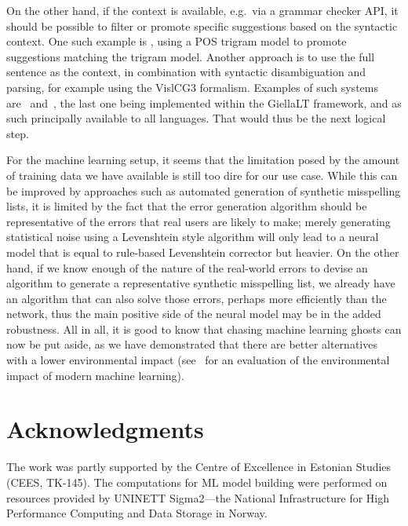 \documentclass{flammie}
\begin{document}
On the other hand, if the context is available, e.g.\ via a grammar checker API,
it should be possible to filter or promote specific suggestions based on the
syntactic context. One such example is \cite{pirinen2012improving}, using a POS
trigram model to promote suggestions matching the trigram model. Another
approach is to use the full sentence as the context, in combination with
syntactic disambiguation and parsing, for example using the VislCG3 formalism.
Examples of such systems are~\cite{Bick2006constraint}
and~\cite{wiechetek2019seeing}, the last one being implemented within the
GiellaLT framework, and as such principally available to all languages. That
would thus be the next logical step.

For the machine learning setup, it seems that the limitation posed by the amount
of training data we have available is still too dire for our use case. While
this can be improved by approaches such as automated generation of synthetic
misspelling lists, it is limited by the fact that the error generation algorithm
should be representative of the errors that real users are likely to make;
merely generating statistical noise using a Levenshtein style algorithm will
only lead to a neural model that is equal to rule-based Levenshtein corrector
but heavier. On the other hand, if we know enough of  the nature of the
real-world errors to devise an algorithm to generate a representative synthetic
misspelling list, we already have an algorithm that can also solve those errors,
perhaps more efficiently than the network, thus the main positive side of the
neural model may be in the added robustness.  All in all, it is good to know
that chasing machine learning ghosts can now be put aside, as we have
demonstrated that there are better alternatives with a lower environmental
impact (see~\cite{strubell2019energy} for an evaluation of the environmental
impact of modern machine learning).


\clearpage

\section*{Acknowledgments}

The work was partly supported by the Centre of Excellence in Estonian Studies
(CEES, TK-145).  The computations for ML model building were performed on
resources provided by UNINETT Sigma2---the National Infrastructure for High
Performance Computing and Data Storage in Norway.



\end{document}
